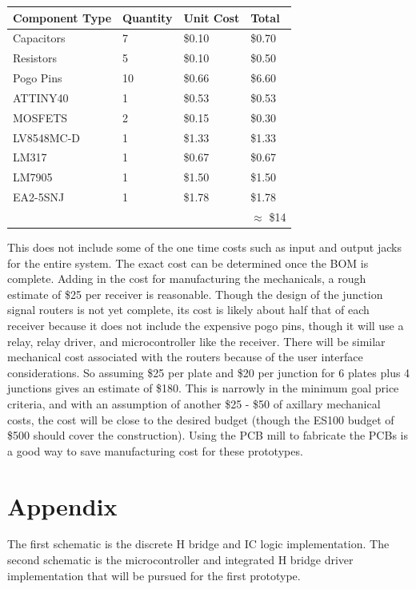 \documentclass{article}
\begin{document}
	\begin{table}[H]
	\begin{tabular}{l l l|l}
	Component Type & Quantity & Unit Cost & Total\\
	\hline
	Capacitors & 7 & \$0.10 & \$0.70 \\
	Resistors & 5 & \$0.10 & \$0.50 \\
	Pogo Pins & 10 & \$0.66 & \$6.60 \\
	ATTINY40 & 1 & \$0.53 & \$0.53 \\
	MOSFETS & 2 & \$0.15 & \$0.30 \\
	LV8548MC-D & 1 & \$1.33 & \$1.33 \\
	LM317 & 1 & \$0.67 & \$0.67 \\
	LM7905 & 1 & \$1.50 & \$1.50 \\
	EA2-5SNJ & 1 & \$1.78 & \$1.78 \\
	\hline
	 & & & $\approx$ \$14
	 \end{tabular}
	 \end{table}

	 This does not include some of the one time costs such as input and output jacks for the entire system.  The exact cost can be determined once the BOM is complete.  Adding in the cost for manufacturing the mechanicals, a rough estimate of \$25 per receiver is reasonable.  Though the design of the junction signal routers is not yet complete, its cost is likely about half that of each receiver because it does not include the expensive pogo pins, though it will use a relay, relay driver, and microcontroller like the receiver.  There will be similar mechanical cost associated with the routers because of the user interface considerations.  So assuming \$25 per plate and \$20 per junction for 6 plates plus 4 junctions gives an estimate of \$180.  This is narrowly in the minimum goal price criteria, and with an assumption of another \$25 - \$50 of axillary mechanical costs, the cost will be close to the desired budget (though the ES100 budget of \$500 should cover the construction).  Using the PCB mill to fabricate the PCBs is a good way to save manufacturing cost for these prototypes.


\newpage



\section{Appendix}
The first schematic is the discrete H bridge and IC logic implementation.
The second schematic is the microcontroller and integrated H bridge driver implementation that will be pursued for the first prototype.
\end{document}
